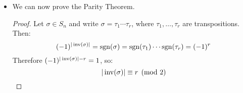 \begin{itemize}
\begin{lemma}
\begin{enumerate}
            \begin{equation}
                \sgn(\sigma\tau) = \sgn(\sigma)\sgn(\tau)
            \end{equation}
            \item If $\tau\in S_n$ is a transposition, then $\sgn(\tau)=-1$.
        \end{enumerate}
    \end{lemma}
    \begin{proof}
        We prove both parts:
        \begin{enumerate}
            \item Let $\sigma,\tau \in S_n$. Then:
            \begin{align}
                \sgn(\sigma\tau)V_n &= A_{\sigma\tau}(V_n) \\ 
                &= A_\sigma(A_\tau(V_n)) \\ 
                &= A_\sigma(\sgn(\tau)V_n) \\ 
                &= A_\sigma(\sgn\tau)A_\sigma(V_n) \\ 
                &= \sgn(\tau)A_\sigma(V_n) \\ 
                &= \sgn(\tau)\sgn(\sigma)V_n \\ 
                &= \sgn(\sigma)\sgn(\tau)V_n
            \end{align}
            \item Let $\tau \in S_n$ be a transposition. By an earlier lemma, we have $|\inv\tau|$ is odd. Therefore:
            \begin{equation}
                \sgn(\tau) = (-1)^{|\inv\tau|} = -1
            \end{equation}
        \end{enumerate}
    \end{proof}
    \item We can now prove the Parity Theorem.
    \begin{proof}
        Let $\sigma\in S_n$ and write $\sigma = \tau_1\cdots \tau_r$, where $\tau_1,\dots,\tau_r$ are transpositions. Then:
        \begin{equation}
            (-1)^{|\operatorname{inv}(\sigma)|} = \operatorname{sgn}(\sigma)=\operatorname{sgn}(\tau_1)\cdots \operatorname{sgn}(\tau_r) = (-1)^r
        \end{equation}
        Therefore $(-1)^{|\operatorname{inv}(\sigma)|-r}=1$, so:
        \begin{equation}
            |\operatorname{inv}(\sigma)| \equiv r \pmod{2}
        \end{equation}
    \end{proof}

\end{itemize}

